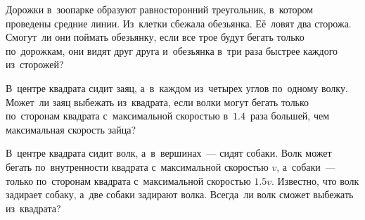 \begin{problems}
\item
Дорожки в~зоопарке образуют равносторонний треугольник, в~котором проведены
средние линии.
Из~клетки сбежала обезьянка.
Её~ловят два сторожа.
Смогут~ли они поймать обезьянку, если все трое будут бегать только по~дорожкам,
они видят друг друга и~обезьянка в~три раза быстрее каждого из~сторожей?

\item
В~центре квадрата сидит заяц, а~в~каждом из~четырех углов по~одному волку.
Может~ли заяц выбежать из~квадрата, если волки могут бегать только по~сторонам
квадрата с~максимальной скоростью в~$1.4$~раза большей, чем максимальная
скорость зайца?

\item
В~центре квадрата сидит волк, а~в~вершинах~--- сидят собаки.
Волк может бегать по~внутренности квадрата с~максимальной скоростью $v$,
а~собаки~--- только по~сторонам квадрата с~максимальной скоростью $1.5v$.
Известно, что волк задирает собаку, а~две собаки задирают волка.
Всегда~ли волк сможет выбежать из~квадрата?

\end{problems}

